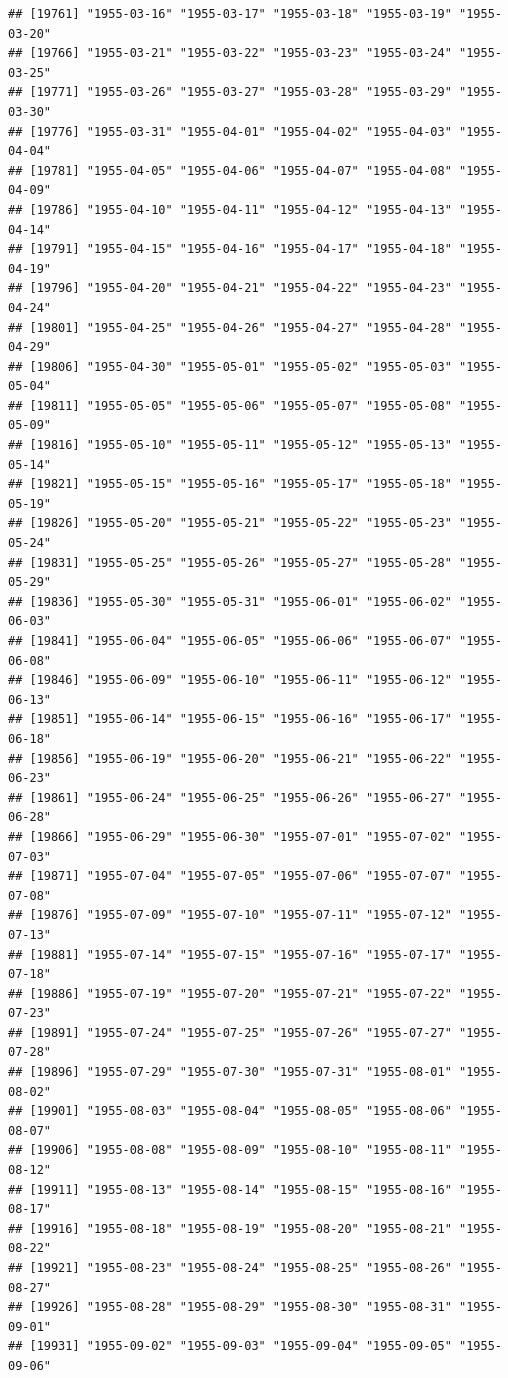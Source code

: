 \documentclass{article}\usepackage[]{graphicx}\usepackage[]{color}
\makeatletter
\newenvironment{kframe}{%
 \def\at@end@of@kframe{}%
 \ifinner\ifhmode%
  \def\at@end@of@kframe{\end{minipage}}%
  \begin{minipage}{\columnwidth}%
 \fi\fi%
 \def\FrameCommand##1{\hskip\@totalleftmargin \hskip-\fboxsep
 \colorbox{shadecolor}{##1}\hskip-\fboxsep
     \hskip-\linewidth \hskip-\@totalleftmargin \hskip\columnwidth}%
 \MakeFramed {\advance\hsize-\width
   \@totalleftmargin\z@ \linewidth\hsize
   \@setminipage}}%
 {\par\unskip\endMakeFramed%
 \at@end@of@kframe}
\newenvironment{knitrout}{}{} %
\makeatother
\begin{document}
\begin{description}
\begin{knitrout}
\begin{kframe}
\begin{verbatim}
## [19761] "1955-03-16" "1955-03-17" "1955-03-18" "1955-03-19" "1955-03-20"
## [19766] "1955-03-21" "1955-03-22" "1955-03-23" "1955-03-24" "1955-03-25"
## [19771] "1955-03-26" "1955-03-27" "1955-03-28" "1955-03-29" "1955-03-30"
## [19776] "1955-03-31" "1955-04-01" "1955-04-02" "1955-04-03" "1955-04-04"
## [19781] "1955-04-05" "1955-04-06" "1955-04-07" "1955-04-08" "1955-04-09"
## [19786] "1955-04-10" "1955-04-11" "1955-04-12" "1955-04-13" "1955-04-14"
## [19791] "1955-04-15" "1955-04-16" "1955-04-17" "1955-04-18" "1955-04-19"
## [19796] "1955-04-20" "1955-04-21" "1955-04-22" "1955-04-23" "1955-04-24"
## [19801] "1955-04-25" "1955-04-26" "1955-04-27" "1955-04-28" "1955-04-29"
## [19806] "1955-04-30" "1955-05-01" "1955-05-02" "1955-05-03" "1955-05-04"
## [19811] "1955-05-05" "1955-05-06" "1955-05-07" "1955-05-08" "1955-05-09"
## [19816] "1955-05-10" "1955-05-11" "1955-05-12" "1955-05-13" "1955-05-14"
## [19821] "1955-05-15" "1955-05-16" "1955-05-17" "1955-05-18" "1955-05-19"
## [19826] "1955-05-20" "1955-05-21" "1955-05-22" "1955-05-23" "1955-05-24"
## [19831] "1955-05-25" "1955-05-26" "1955-05-27" "1955-05-28" "1955-05-29"
## [19836] "1955-05-30" "1955-05-31" "1955-06-01" "1955-06-02" "1955-06-03"
## [19841] "1955-06-04" "1955-06-05" "1955-06-06" "1955-06-07" "1955-06-08"
## [19846] "1955-06-09" "1955-06-10" "1955-06-11" "1955-06-12" "1955-06-13"
## [19851] "1955-06-14" "1955-06-15" "1955-06-16" "1955-06-17" "1955-06-18"
## [19856] "1955-06-19" "1955-06-20" "1955-06-21" "1955-06-22" "1955-06-23"
## [19861] "1955-06-24" "1955-06-25" "1955-06-26" "1955-06-27" "1955-06-28"
## [19866] "1955-06-29" "1955-06-30" "1955-07-01" "1955-07-02" "1955-07-03"
## [19871] "1955-07-04" "1955-07-05" "1955-07-06" "1955-07-07" "1955-07-08"
## [19876] "1955-07-09" "1955-07-10" "1955-07-11" "1955-07-12" "1955-07-13"
## [19881] "1955-07-14" "1955-07-15" "1955-07-16" "1955-07-17" "1955-07-18"
## [19886] "1955-07-19" "1955-07-20" "1955-07-21" "1955-07-22" "1955-07-23"
## [19891] "1955-07-24" "1955-07-25" "1955-07-26" "1955-07-27" "1955-07-28"
## [19896] "1955-07-29" "1955-07-30" "1955-07-31" "1955-08-01" "1955-08-02"
## [19901] "1955-08-03" "1955-08-04" "1955-08-05" "1955-08-06" "1955-08-07"
## [19906] "1955-08-08" "1955-08-09" "1955-08-10" "1955-08-11" "1955-08-12"
## [19911] "1955-08-13" "1955-08-14" "1955-08-15" "1955-08-16" "1955-08-17"
## [19916] "1955-08-18" "1955-08-19" "1955-08-20" "1955-08-21" "1955-08-22"
## [19921] "1955-08-23" "1955-08-24" "1955-08-25" "1955-08-26" "1955-08-27"
## [19926] "1955-08-28" "1955-08-29" "1955-08-30" "1955-08-31" "1955-09-01"
## [19931] "1955-09-02" "1955-09-03" "1955-09-04" "1955-09-05" "1955-09-06"

\end{verbatim}
\end{kframe}
\end{knitrout}
\end{description}
\end{document}
